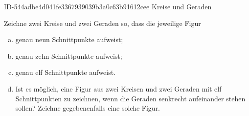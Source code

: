 \begin{exercise}
      {ID-544adbe4d041fe3367939039b3a0c63b91612cee}
      {Kreise und Geraden}
  \ifproblem\problem\par
    Zeichne zwei Kreise und zwei Geraden so, dass die jeweilige Figur
    \begin{enumerate}[a)]
      \item genau neun Schnittpunkte aufweist;
      \item genau zehn Schnittpunkte aufweist;
      \item genau elf Schnittpunkte aufweist.
      \item Ist es möglich, eine Figur aus zwei Kreisen und zwei Geraden mit elf
            Schnittpunkten zu zeichnen, wenn die Geraden senkrecht aufeinander
            stehen sollen? Zeichne gegebenenfalls eine solche Figur.
    \end{enumerate}
  \fi
\end{exercise}
